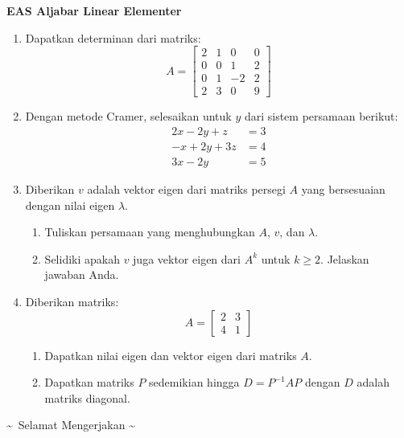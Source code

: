\documentclass[12pt]{article}
\begin{document}
\begin{center}
    \textbf{EAS Aljabar Linear Elementer}
\end{center}

\vspace{0.5cm}

\begin{enumerate}
    \item Dapatkan determinan dari matriks:
    \[
    A = \begin{bmatrix}
    2 & 1 & 0 & 0 \\
    0 & 0 & 1 & 2 \\
    0 & 1 & -2 & 2 \\
    2 & 3 & 0 & 9
    \end{bmatrix}
    \]

    \item Dengan metode Cramer, selesaikan untuk $y$ dari sistem persamaan berikut:
    \[
    \begin{aligned}
    2x - 2y + z &= 3 \\
    -x + 2y + 3z &= 4 \\
    3x - 2y &= 5
    \end{aligned}
    \]

    \item Diberikan $v$ adalah vektor eigen dari matriks persegi $A$ yang bersesuaian dengan nilai eigen $\lambda$.
    \begin{enumerate}[label=\alph*.]
        \item Tuliskan persamaan yang menghubungkan $A$, $v$, dan $\lambda$.
        \item Selidiki apakah $v$ juga vektor eigen dari $A^k$ untuk $k \geq 2$. Jelaskan jawaban Anda.
    \end{enumerate}

    \item Diberikan matriks:
    \[
    A = \begin{bmatrix}
    2 & 3 \\
    4 & 1
    \end{bmatrix}
    \]
    \begin{enumerate}[label=\alph*.]
        \item Dapatkan nilai eigen dan vektor eigen dari matriks $A$.
        \item Dapatkan matriks $P$ sedemikian hingga $D = P^{-1} A P$ dengan $D$ adalah matriks diagonal.
    \end{enumerate}
\end{enumerate}

\vspace{1cm}
\begin{center}
    \textasciitilde\ Selamat Mengerjakan \textasciitilde
\end{center}
\end{document}
